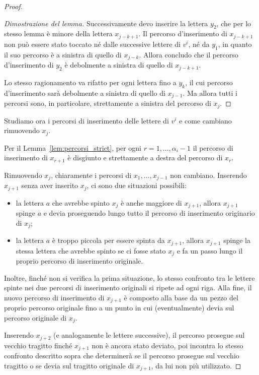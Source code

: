 \begin{proof}
\begin{proof}[Dimostrazione del lemma]
        Successivamente devo inserire la lettera $y_2 $, che per lo stesso lemma
        \`e minore della lettera $x_{j-k+1}$.
        Il percorso d'inserimento di $x_{j-k+1}$ non pu\`o essere stato toccato n\'e dalle
        successive lettere di $v^i$, n\'e da $y_1$, in quanto il suo percorso \`e a sinistra
        di quello di $x_{j-k}$.
        Allora concludo che il percorso d'inserimento di $y_2$ \`e debolmente a sinistra
        di quello di $x_{j-k+1}$.

        Lo stesso ragionamento va rifatto per ogni lettera fino a $y_k$, il cui percorso
        d'inserimento sar\`a debolmente a sinistra di quello di $x_{j-1}$.
        Ma allora tutti i percorsi sono, in particolare, strettamente a sinistra
        del percorso di $x_j$.
    \end{proof}

    Studiamo ora i percorsi di inserimento delle lettere di $v^i$ e come cambiano
    rimuovendo $x_j$.

    Per il Lemma~\ref{lem:percorsi_strict}, per ogni $r = 1, \dots, \alpha_i-1$
    il percorso di inserimento di $x_{r+1}$ \`e disgiunto e strettamente
    a destra del percorso di $x_r$.

    Rimuovendo $x_j$, chiaramente i percorsi di $x_1, \dots, x_{j-1}$ non cambiano.
    Inserendo $x_{j+1}$ senza aver inserito $x_j$, ci sono due situazioni possibili:
    \begin{itemize}
        \item la lettera $a$ che avrebbe spinto $x_j$ \`e anche maggiore di $x_{j+1}$,
            allora $x_{j+1}$ spinge $a$ e devia proseguendo lungo tutto il percorso
            di inserimento originario di $x_j$;
        \item la lettera $a$ \`e troppo piccola per essere spinta da $x_{j+1}$,
            allora $x_{j+1}$ spinge la stessa lettera che avrebbe spinto se ci fosse stato
            $x_j$ e fa un passo lungo il proprio percorso di inserimento originale.
    \end{itemize}
    Inoltre, finch\'e non si verifica la prima situazione,
    lo stesso confronto tra le lettere spinte nei due percorsi di inserimento originali
    si ripete ad ogni riga.
    Alla fine, il nuovo percorso di inserimento di $x_{j+1}$ \`e composto alla
    base da un pezzo del proprio percorso originale fino a un punto in cui (eventualmente)
    devia sul percorso originale di $x_j$.

    Inserendo $x_{j+2}$ (e analogamente le lettere successive), il percorso prosegue
    sul vecchio tragitto finch\'e $x_{j+1}$ non \`e ancora stato deviato,
    poi incontra lo stesso confronto descritto sopra che determiner\`a se
    il percorso prosegue sul vecchio tragitto o se devia sul tragitto originale
    di $x_{j+1}$, da lui non pi\`u utilizzato.


\end{proof}
